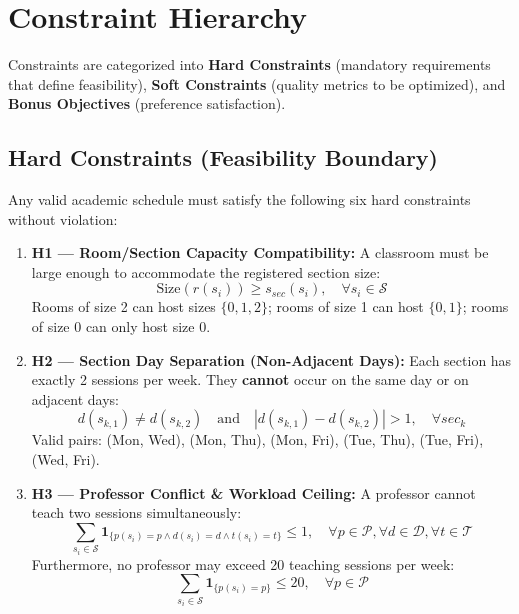 \documentclass[12pt,a4paper]{report}
\begin{document}
\section{Constraint Hierarchy}
Constraints are categorized into \textbf{Hard Constraints} (mandatory requirements that define feasibility), \textbf{Soft Constraints} (quality metrics to be optimized), and \textbf{Bonus Objectives} (preference satisfaction).

\subsection{Hard Constraints (Feasibility Boundary)}
Any valid academic schedule must satisfy the following six hard constraints without violation:
\begin{enumerate}[leftmargin=2.0em]
  \item \textbf{H1 --- Room/Section Capacity Compatibility:}
  A classroom must be large enough to accommodate the registered section size:
  \begin{equation}
    \text{Size}(r(s_i)) \ge s_{sec}(s_i), \quad \forall s_i \in \mathcal{S}
  \end{equation}
  Rooms of size 2 can host sizes $\{0, 1, 2\}$; rooms of size 1 can host $\{0, 1\}$; rooms of size 0 can only host size $0$.

  \item \textbf{H2 --- Section Day Separation (Non-Adjacent Days):}
  Each section has exactly 2 sessions per week. They \textbf{cannot} occur on the same day or on adjacent days:
  \begin{equation}
    d(s_{k, 1}) \ne d(s_{k, 2}) \quad \text{and} \quad |d(s_{k, 1}) - d(s_{k, 2})| > 1, \quad \forall sec_k
  \end{equation}
  Valid pairs: (Mon, Wed), (Mon, Thu), (Mon, Fri), (Tue, Thu), (Tue, Fri), (Wed, Fri).

  \item \textbf{H3 --- Professor Conflict \& Workload Ceiling:}
  A professor cannot teach two sessions simultaneously:
  \begin{equation}
    \sum_{s_i \in \mathcal{S}} \mathbf{1}_{\{p(s_i) = p \land d(s_i) = d \land t(s_i) = t\}} \le 1, \quad \forall p \in \mathcal{P}, \forall d \in \mathcal{D}, \forall t \in \mathcal{T}
  \end{equation}
  Furthermore, no professor may exceed 20 teaching sessions per week:
  \begin{equation}
    \sum_{s_i \in \mathcal{S}} \mathbf{1}_{\{p(s_i) = p\}} \le 20, \quad \forall p \in \mathcal{P}
  \end{equation}


\end{enumerate}
\end{document}
